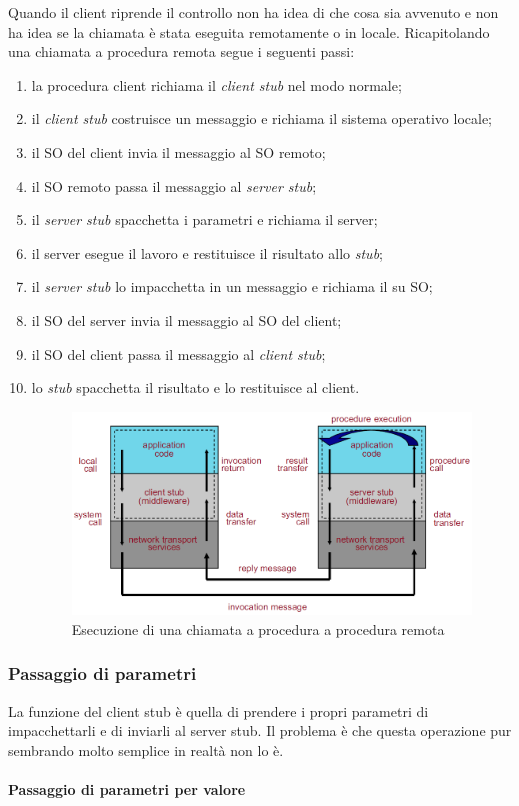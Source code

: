 Quando il client riprende il controllo non ha idea di che cosa sia avvenuto e non ha idea se la chiamata è stata eseguita remotamente o in locale.
Ricapitolando una chiamata a procedura remota segue i seguenti passi:
\begin{enumerate}
\item la procedura client richiama il \emph{client stub} nel modo normale;
\item il \emph{client stub} costruisce un messaggio e richiama il sistema operativo locale;
\item il SO del client invia il messaggio al SO remoto;
\item il SO remoto passa il messaggio al \emph{server stub};
\item il \emph{server stub} spacchetta i parametri e richiama il server;
\item il server esegue il lavoro e restituisce il risultato allo \emph{stub};
\item il \emph{server stub} lo impacchetta in un messaggio e richiama il su SO;
\item il SO del server invia il messaggio al SO del client;
\item il SO del client passa il messaggio al \emph{client stub};
\item lo \emph{stub} spacchetta il risultato e lo restituisce al client.
\begin{figure}
\centering
\includegraphics[scale=0.5]{img/execution.png}
\caption{Esecuzione di una chiamata a procedura a procedura remota}\label{img:executionrpc}
\end{figure}
\end{enumerate}
\subsubsection{Passaggio di parametri}
La funzione del client stub è quella di prendere i propri parametri di impacchettarli e di inviarli al server stub. Il problema è che questa operazione pur sembrando molto semplice in realtà non lo è.
\paragraph{Passaggio di parametri per valore}